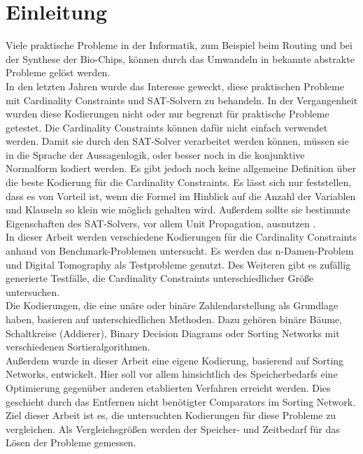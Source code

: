\documentclass[a4,abstract=on]{scrartcl}
\newcommand*\stdsection{}
\let\stdsection\section
\renewcommand*\section{%
    \clearpage\ifodd\value{page}\else\mbox{}\clearpage\fi
    \stdsection}
\begin{document}
\section{Einleitung}
Viele praktische Probleme in der Informatik, zum Beispiel beim Routing und bei der Synthese der Bio-Chips, können durch das Umwandeln in bekannte abstrakte Probleme gelöst werden.\\
In den letzten Jahren wurde das Interesse geweckt, diese praktischen Probleme mit Cardinality Constraints und SAT-Solvern zu behandeln. In der Vergangenheit wurden diese Kodierungen nicht oder nur begrenzt für praktische Probleme getestet. Die Cardinality Constraints können dafür nicht einfach verwendet werden. Damit sie durch den SAT-Solver verarbeitet werden können, müssen sie in die Sprache der Aussagenlogik, oder besser noch in die konjunktive Normalform kodiert werden. Es gibt jedoch noch keine allgemeine Definition über die beste Kodierung für die Cardinality Constraints. Es lässt sich nur feststellen, dass es von Vorteil ist, wenn die Formel im Hinblick auf die Anzahl der Variablen und Klauseln so klein wie möglich gehalten wird. Außerdem sollte sie bestimmte Eigenschaften des SAT-Solvers, vor allem Unit Propagation, ausnutzen \cite[vgl.][]{einleitung}.\\
In dieser Arbeit werden verschiedene Kodierungen für die Cardinality Constraints anhand von Benchmark-Problemen untersucht. Es werden das n-Damen-Problem und Digital Tomography als Testprobleme genutzt. Des Weiteren gibt es zufällig generierte Testfälle, die Cardinality Constraints unterschiedlicher Größe untersuchen. \\
Die Kodierungen, die eine unäre oder binäre Zahlendarstellung als Grundlage haben, basieren auf unterschiedlichen Methoden. Dazu gehören binäre Bäume, Schaltkreise (Addierer), Binary Decision Diagrams oder Sorting Networks mit verschiedenen Sortieralgorithmen. \\
Außerdem wurde in dieser Arbeit eine eigene Kodierung, basierend auf Sorting Networks, entwickelt. Hier soll vor allem hinsichtlich des Speicherbedarfs eine Optimierung gegenüber anderen etablierten Verfahren erreicht werden. Dies geschieht durch das Entfernen nicht benötigter Comparators im Sorting Network. \\
Ziel dieser Arbeit ist es, die untersuchten Kodierungen für diese Probleme zu vergleichen. Als Vergleichsgrößen werden der Speicher- und Zeitbedarf für das Lösen der Probleme gemessen. \\
\newline
\end{document}
